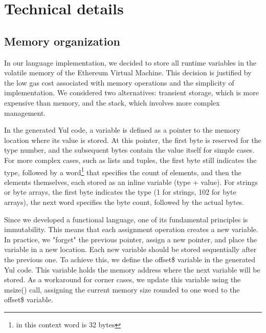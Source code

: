 \section{Technical details}

\subsection{Memory organization}
\label{sec:memory_organization}

In our language implementation, we decided to store all runtime variables in the volatile memory of the Ethereum Virtual Machine. This decision is justified by the low gas cost associated with memory operations and the simplicity of implementation. We considered two alternatives: transient storage, which is more expensive than memory, and the stack, which involves more complex management.

In the generated Yul code, a variable is defined as a pointer to the memory location where its value is stored. At this pointer, the first byte is reserved for the type number, and the subsequent bytes contain the value itself for simple cases. For more complex cases, such as lists and tuples, the first byte still indicates the type, followed by a word\footnote{in this context word is 32 bytes} that specifies the count of elements, and then the elements themselves, each stored as an inline variable (type + value). For strings or byte arrays, the first byte indicates the type (1 for strings, 102 for byte arrays), the next word specifies the byte count, followed by the actual bytes.

Since we developed a functional language, one of its fundamental principles is immutability. This means that each assignment operation creates a new variable. In practice, we "forget" the previous pointer, assign a new pointer, and place the variable in a new location. Each new variable should be stored sequentially after the previous one. To achieve this, we define the offset\$ variable in the generated Yul code. This variable holds the memory address where the next variable will be stored. As a workaround for corner cases, we update this variable using the msize() call, assigning the current memory size rounded to one word to the offset\$ variable.

